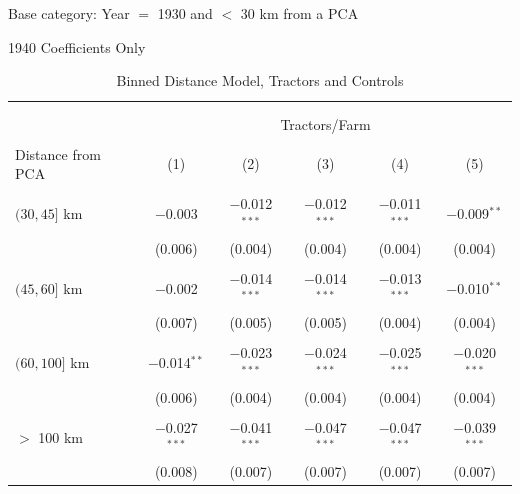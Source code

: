 \documentclass[12pt]{article}
\begin{document}
\begin{table}
\centering

\caption{Binned Distance Model, Tractors and Controls}
\label{tractor_controls}

\footnotesize   
\vspace{.5cm} 

Base category: Year $=$ 1930 and $<$ 30 km from a PCA

1940 Coefficients Only

\begin{threeparttable}[t]
\begin{tabular}{@{\extracolsep{5pt}}lccccc} 
\\[-1.8ex]\hline 
\hline \\[-1.8ex]
\\[-1.8ex] & \multicolumn{5}{c}{Tractors/Farm} \\ [.5em]
\cline{2-6} 
\\[-1.8ex] Distance from PCA & (1) & (2) & (3) & (4) & (5)\\ 
\hline \\[-1.8ex] 
$(30, 45]$ km & $-$0.003        & $-$0.012$^{***}$& $-$0.012$^{***}$& $-$0.011$^{***}$& $-$0.009$^{**}$ \\
              & (0.006)         & (0.004)         & (0.004)         & (0.004)         & (0.004) \\
              &                 &                 &                 &                 & \\
$(45, 60]$ km & $-$0.002        & $-$0.014$^{***}$& $-$0.014$^{***}$& $-$0.013$^{***}$& $-$0.010$^{**}$ \\
              & (0.007)         & (0.005)         & (0.005)         & (0.004)         & (0.004) \\
              &                 &                 &                 &                 & \\
$(60, 100]$ km& $-$0.014$^{**}$ & $-$0.023$^{***}$& $-$0.024$^{***}$& $-$0.025$^{***}$& $-$0.020$^{***}$ \\
              & (0.006)         & (0.004)         & (0.004)         & (0.004)         & (0.004) \\
              &                 &                 &                 &                 & \\
$>$ 100 km    & $-$0.027$^{***}$& $-$0.041$^{***}$& $-$0.047$^{***}$& $-$0.047$^{***}$& $-$0.039$^{***}$ \\
              & (0.008)         & (0.007)         & (0.007)         & (0.007)         & (0.007) \\

\end{tabular}
\end{threeparttable}
\end{table}
\end{document}
